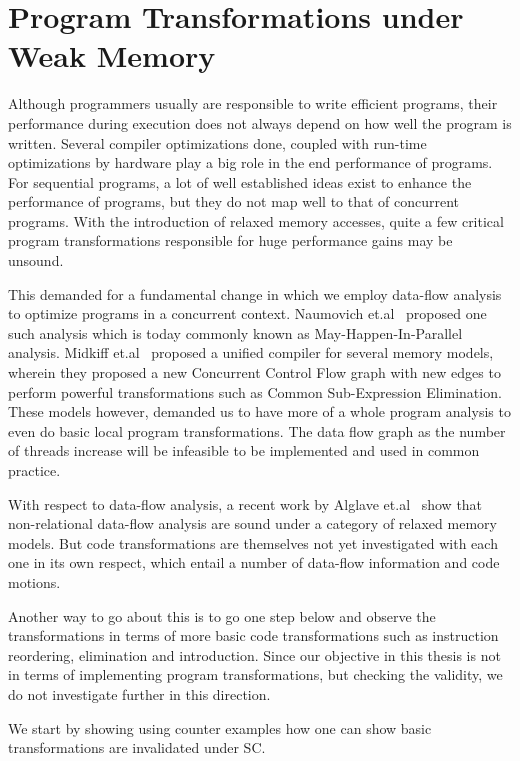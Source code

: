 \section{Program Transformations under Weak Memory}

    Although programmers usually are responsible to write efficient programs, their performance during execution does not always depend on how well the program is written. 
    Several compiler optimizations done, coupled with run-time optimizations by hardware play a big role in the end performance of programs.
    For sequential programs, a lot of well established ideas exist to enhance the performance of programs, but they do not map well to that of concurrent programs. 
    With the introduction of relaxed memory accesses, quite a few critical program transformations responsible for huge performance gains may be unsound. 

    This demanded for a fundamental change in which we employ data-flow analysis to optimize programs in a concurrent context. Naumovich et.al~\cite{NaumovichA} proposed one such analysis which is today commonly known as May-Happen-In-Parallel analysis. 
    Midkiff et.al~\cite{Midkiff} proposed a unified compiler for several memory models, wherein they proposed a new Concurrent Control Flow graph with new edges to perform powerful transformations such as Common Sub-Expression Elimination. 
    These models however, demanded us to have more of a whole program analysis to even do basic local program transformations. 
    The data flow graph as the number of threads increase will be infeasible to be implemented and used in common practice. 
   
    With respect to data-flow analysis, a recent work by Alglave et.al~\cite{Alglave2} show that non-relational data-flow analysis are sound under a category of relaxed memory models. 
    But code transformations are themselves not yet investigated with each one in its own respect, which entail a number of data-flow information and code motions.
    
    Another way to go about this is to go one step below and observe the transformations in terms of more basic code transformations such as instruction reordering, elimination and introduction. 
    Since our objective in this thesis is not in terms of implementing program transformations, but checking the validity, we do not investigate further in this direction. 
    
    We start by showing using counter examples how one can show basic transformations are invalidated under SC.

